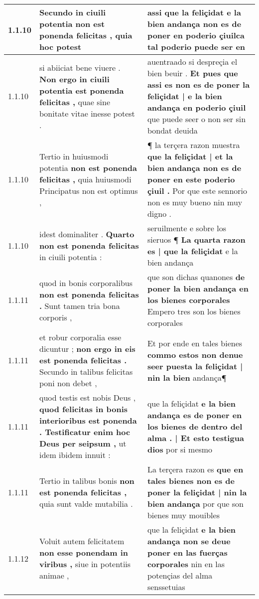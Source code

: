 \begin{tabular}{|p{1cm}|p{6.5cm}|p{6.5cm}|}
1.1.10 & Secundo in ciuili potentia \textbf{ non est ponenda felicitas , } quia hoc potest & assi que la feliçidat \textbf{ e la bien andança non es de poner en poderio } çiuilca tal poderio puede ser en \\\hline
1.1.10 & si abiiciat bene viuere . \textbf{ Non ergo in ciuili potentia est ponenda felicitas , } quae sine bonitate vitae inesse potest . & auentraado si despreçia el bien beuir . \textbf{ Et pues que assi es non es de poner la feliçidat | e la bien andança en poderio çiuil } que puede seer o non ser sin bondat deuida \\\hline
1.1.10 & Tertio in huiusmodi potentia \textbf{ non est ponenda felicitas , } quia huiusmodi Principatus non est optimus , & ¶ la terçera razon muestra \textbf{ que la feliçidat | et la bien andança non es de poner en este poderio çiuil . } Por que este sennorio non es muy bueno nin muy digno . \\\hline
1.1.10 & idest dominaliter . \textbf{ Quarto non est ponenda felicitas } in ciuili potentia : & seruilmente e sobre los sieruos ¶ \textbf{ La quarta razon es | que la feliçidat } e la bien andança \\\hline
1.1.11 & quod in bonis corporalibus \textbf{ non est ponenda felicitas . } Sunt tamen tria bona corporis , & que son dichas quanones \textbf{ de poner la bien andança en los bienes corporales } Empero tres son los bienes corporales \\\hline
1.1.11 & et robur corporalia esse dicuntur ; \textbf{ non ergo in eis est ponenda felicitas . } Secundo in talibus felicitas poni non debet , & Et por ende en tales bienes \textbf{ commo estos non denue seer puesta la feliçidat | nin la bien } andança¶ \\\hline
1.1.11 & quod testis est nobis Deus , \textbf{ quod felicitas in bonis interioribus est ponenda . Testificatur enim hoc Deus per seipsum , } ut idem ibidem innuit : & que la feliçidat \textbf{ e la bien andança es de poner en los bienes de dentro del alma . | Et esto testigua dios } por si mesmo \\\hline
1.1.11 & Tertio in talibus bonis \textbf{ non est ponenda felicitas , } quia sunt valde mutabilia . & La terçera razon es \textbf{ que en tales bienes non es de poner la feliçidat | nin la bien andança } por que son bienes muy mouibles \\\hline
1.1.12 & Voluit autem felicitatem \textbf{ non esse ponendam in viribus , } siue in potentiis animae , & que la feliçidat \textbf{ e la bien andança non se deue poner en las fuerças corporales } nin en las potençias del alma senssetuias \\\hline

\end{tabular}
